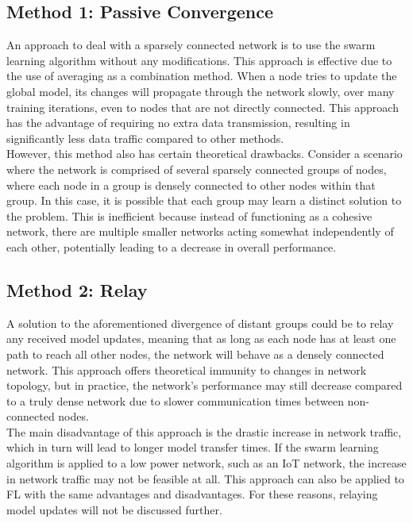 \subsection{Method 1: Passive Convergence}
An approach to deal with a sparsely connected network is to use the swarm learning algorithm without any modifications. This approach is effective due to the use of averaging as a combination method. When a node tries to update the global model, its changes will propagate through the network slowly, over many training iterations, even to nodes that are not directly connected. This approach has the advantage of requiring no extra data transmission, resulting in significantly less data traffic compared to other methods. \\

However, this method also has certain theoretical drawbacks. Consider a scenario where the network is comprised of several sparsely connected groups of nodes, where each node in a group is densely connected to other nodes within that group. In this case, it is possible that each group may learn a distinct solution to the problem. This is inefficient because instead of functioning as a cohesive network, there are multiple smaller networks acting somewhat independently of each other, potentially leading to a decrease in overall performance.


\subsection{Method 2: Relay} \label{relay}
A solution to the aforementioned divergence of distant groups could be to relay any received model updates, meaning that as long as each node has at least one path to reach all other nodes, the network will behave as a densely connected network. This approach offers theoretical immunity to changes in network topology, but in practice, the network's performance may still decrease compared to a truly dense network due to slower communication times between non-connected nodes. \\

The main disadvantage of this approach is the drastic increase in network traffic, which in turn will lead to longer model transfer times. If the swarm learning algorithm is applied to a low power network, such as an IoT network, the increase in network traffic may not be feasible at all. This approach can also be applied to FL with the same advantages and disadvantages. For these reasons, relaying model updates will not be discussed further.
